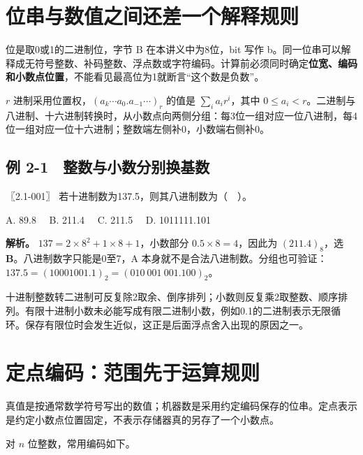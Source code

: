 \section{位串与数值之间还差一个解释规则}\label{co-02-01}

位是取0或1的二进制位，字节 B 在本讲义中为8位，bit 写作 b。同一位串可以解释成无符号整数、补码整数、浮点数或字符编码。计算前必须同时确定\textbf{位宽、编码和小数点位置}，不能看见最高位为1就断言``这个数是负数''。

\(r\) 进制采用位置权，\((a_k\cdots a_0.a_{-1}\cdots)_r\) 的值是 \(\sum_i a_i r^i\)，其中 \(0\le a_i<r\)。二进制与八进制、十六进制转换时，从小数点向两侧分组：每3位一组对应一位八进制，每4位一组对应一位十六进制；整数端左侧补0，小数端右侧补0。

\subsection{例 2-1　整数与小数分别换基数}\label{co-ex2-1}

\noindent{}〖2.1-001〗 若十进制数为137.5，则其八进制数为（　）。

A. 89.8　 B. 211.4　 C. 211.5　 D. 1011111.101


\textbf{解析。} \(137=2\times8^2+1\times8+1\)，小数部分 \(0.5\times8=4\)，因此为 \((211.4)_8\)，选 \textbf{B}。八进制数字只能是0至7，A 本身就不是合法八进制数。分组也可验证：\(137.5=(10001001.1)_2=(010\ 001\ 001.100)_2\)。

十进制整数转二进制可反复除2取余、倒序排列；小数则反复乘2取整数、顺序排列。有限十进制小数未必能写成有限二进制小数，例如0.1的二进制表示无限循环。保存有限位时会发生近似，这正是后面浮点舍入出现的原因之一。

\section{定点编码：范围先于运算规则}\label{co-02-02}

真值是按通常数学符号写出的数值；机器数是采用约定编码保存的位串。定点表示是约定小数点位置固定，不表示存储器真的另存了一个小数点。

对 \(n\) 位整数，常用编码如下。

